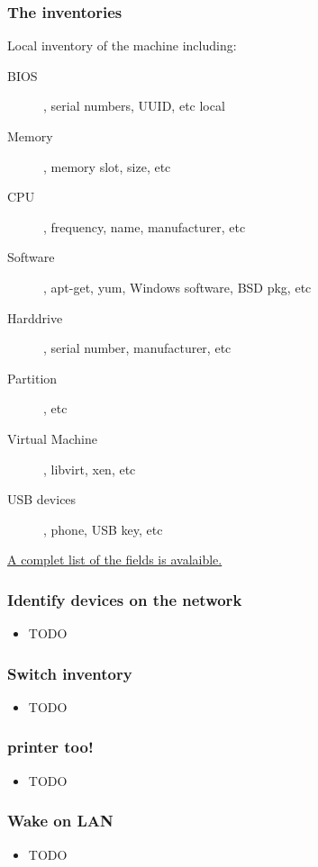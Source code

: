 \begin{frame}
    \frametitle{The inventories}

Local inventory of the machine including:
    \begin{description}
        \item[BIOS], serial numbers, UUID, etc local
        \item[Memory], memory slot, size, etc
        \item[CPU], frequency, name, manufacturer, etc
        \item[Software], apt-get, yum, Windows software, BSD pkg, etc
        \item[Harddrive], serial number, manufacturer, etc
        \item[Partition], etc
        \item[Virtual Machine], libvirt, xen, etc
        \item[USB devices], phone, USB key, etc
    \end{description}
\href{http://search.cpan.org/dist/FusionInventory-Agent/lib/FusionInventory/Agent/XML/Query/Inventory.pm}{A complet list of the fields is avalaible.}
\end{frame}

\begin{frame}
    \frametitle{Identify devices on the network}

    \begin{itemize}
        \item TODO
    \end{itemize}
\end{frame}

\begin{frame}
    \frametitle{Switch inventory}

    \begin{itemize}
        \item TODO
    \end{itemize}
\end{frame}

\begin{frame}
    \frametitle{printer too!}

    \begin{itemize}
        \item TODO
    \end{itemize}
\end{frame}

\begin{frame}
    \frametitle{Wake on LAN}

    \begin{itemize}
        \item TODO
    \end{itemize}
\end{frame}

